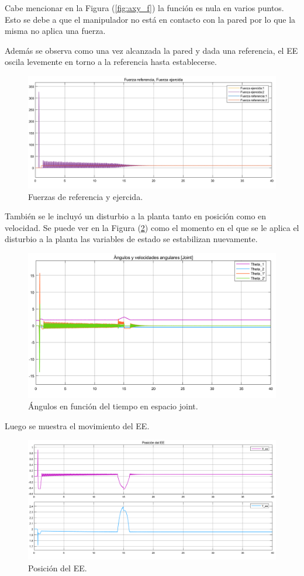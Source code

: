 Cabe mencionar en la Figura (\ref{fig:axy_f}) la función es nula en varios puntos. Esto se debe a que el manipulador no está en contacto con la pared por lo que la misma no aplica una fuerza.

Además se observa como una vez alcanzada la pared y dada una referencia, el EE oscila levemente en torno a la referencia hasta establecerse.

\begin{figure}[H]
	\centering
	\includegraphics[width=0.8\linewidth]{ImagenesControl de fuerza no lineal/2_3_e}
	\caption{Fuerzas de referencia y ejercida.}	
	\label{fig:af_f}
\end{figure}

También se le incluyó un disturbio a la planta tanto en posición como en velocidad. Se puede ver en la Figura (\ref{fig:athetasd_f}) como el momento en el que se le aplica el disturbio a la planta las variables de estado se estabilizan nuevamente.
\begin{figure}[H]
	\centering
	\includegraphics[width=0.8\linewidth]{ImagenesControl de fuerza no lineal/2_3_f_a}
	\caption{Ángulos en función del tiempo en espacio joint.}	
	\label{fig:athetasd_f}
\end{figure}

Luego se muestra el movimiento del EE.
\begin{figure}[H]
	\centering
	\includegraphics[width=0.8\linewidth]{ImagenesControl de fuerza no lineal/2_3_f_b}
	\caption{Posición del EE.}	
	\label{fig:aposd_f}
\end{figure}

